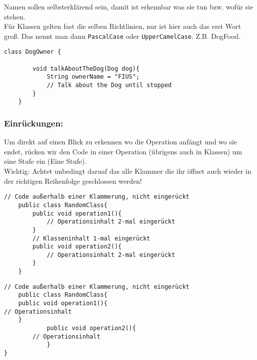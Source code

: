 \noindent
Namen sollen selbsterklärend sein, damit ist erkennbar was sie tun bzw. wofür sie stehen.\\

\noindent
Für Klassen gelten fast die selben Richtlinien, nur ist hier auch das erst Wort groß.
Das nennt man dann \lstinline{PascalCase} oder \lstinline{UpperCamelCase}. Z.B. DogFood.

\vspace{5mm}

\begin{lstlisting}[title=\textbf{Beispiel gute Namensgebung}]
	class DogOwner {

		void talkAboutTheDog(Dog dog){
			String ownerName = "FIUS";
			// Talk about the Dog until stopped
		}
	}
\end{lstlisting}

\subsubsection*{Einrückungen:}
Um direkt auf einen Blick zu erkennen wo die Operation anfängt und wo sie endet, rücken wir den Code in einer Operation (übrigens auch in Klassen) um eine Stufe ein (Eine  Stufe).\\

\noindent
{\color{red} Wichtig: }Achtet unbedingt daruaf das alle Klammer die ihr öffnet auch wieder in der richtigen Reihenfolge geschlossen werden!

\vspace{5mm}

\begin{lstlisting}[title=\textbf{Beispiel gute Namensgebung}]
	// Code außerhalb einer Klammerung, nicht eingerückt
	public class RandomClass{
		public void operation1(){
			// Operationsinhalt 2-mal eingerückt
		}
		// Klasseninhalt 1-mal eingerückt
		public void operation2(){
			// Operationsinhalt 2-mal eingerückt
		}
	}
\end{lstlisting}

\newpage

\begin{lstlisting}[title=\textbf{Beispiel schlechte Einrückung}]
	// Code außerhalb einer Klammerung, nicht eingerückt
	public class RandomClass{
	public void operation1(){
// Operationsinhalt
	}
			public void operation2(){
		// Operationsinhalt
			}
}
\end{lstlisting}

